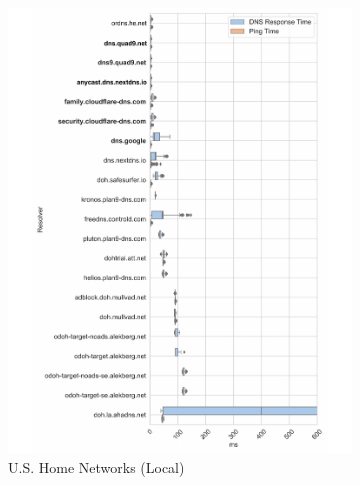 \begin{figure}[h!]
\centering
\begin{subfigure}[b]{0.35\textwidth}
\includegraphics[width=\textwidth]{figures/poah_NA.pdf}
    \caption{U.S. Home Networks (Local)}
\end{subfigure}
%
\begin{subfigure}[b]{0.35\textwidth}

\end{subfigure}
\end{figure}
